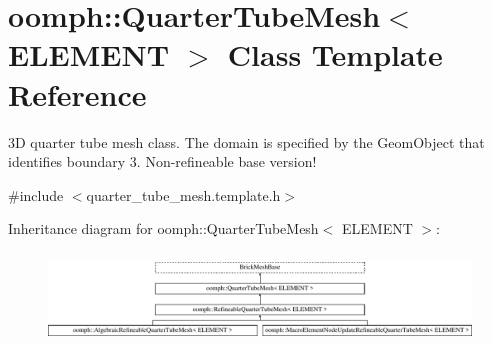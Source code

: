 \hypertarget{classoomph_1_1QuarterTubeMesh}{}\section{oomph\+:\+:Quarter\+Tube\+Mesh$<$ E\+L\+E\+M\+E\+NT $>$ Class Template Reference}
\label{classoomph_1_1QuarterTubeMesh}


3D quarter tube mesh class. The domain is specified by the Geom\+Object that identifies boundary 3. Non-\/refineable base version!  




{\ttfamily \#include $<$quarter\+\_\+tube\+\_\+mesh.\+template.\+h$>$}

Inheritance diagram for oomph\+:\+:Quarter\+Tube\+Mesh$<$ E\+L\+E\+M\+E\+NT $>$\+:\begin{figure}[H]
\begin{center}
\leavevmode
\includegraphics[height=2.445415cm]{classoomph_1_1QuarterTubeMesh}
\end{center}
\end{figure}
